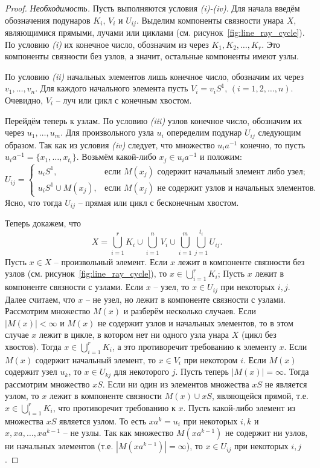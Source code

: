 \documentclass[11pt,twoside,final
]{article}
\begin{document}
\begin{proof}
	\textit{Необходимость.}
	Пусть выполняются условия \textit{(i)-(iv)}.
	Для начала введём обозначения подунаров $K_i$, $V_i$ и $U_{ij}$.
	Выделим компоненты связности унара $X$, являющимися прямыми, лучами или циклами (см. рисунок~\ref{fig:line_ray_cycle}).
	По условию \textit{(i)} их конечное число, обозначим из через $K_1, K_2, \ldots, K_r$.
	Это компоненты связности без узлов, а значит, остальные компоненты имеют узлы.

	По условию \textit{(ii)} начальных элементов лишь конечное число, обозначим их через $v_1,\ldots, v_n$.
	Для каждого начального элемента пусть $V_i = v_i S^1$, $(i=1,2,\ldots,n)$.
	Очевидно, $V_i$ -- луч или цикл с конечным хвостом.

	Перейдём теперь к узлам.
	По условию \textit{(iii)} узлов конечное число, обозначим их через $ u_1, \ldots, u_m$.
	Для произвольного узла $u_i$ опеределим подунар $U_{ij}$ следующим образом.
	Так как из условия \textit{(iv)} следует, что множество $u_i a^{-1}$ конечно, то пусть $u_i a^{-1} = \{ x_1, \ldots, x_{t_i} \}$.
	Возьмём какой-либо $x_j \in u_i a^{-1}$ и положим:
	\[
		U_{ij} =
		\begin{cases}
			u_i S^1,             & \text{если } M(x_j) \text{ содержит начальный элемент либо узел};    \\
			u_i S^1 \cup M(x_j), & \text{если } M(x_j) \text{ не содержит узлов и начальных элементов}.
		\end{cases}
	\]
	Ясно, что тогда $U_{ij}$ -- прямая или цикл с бесконечным хвостом.

	Теперь докажем, что
	\[
		X = \bigcup_{i = 1}^r K_i \cup \bigcup_{i = 1}^n V_i \cup \bigcup_{i = 1}^m \bigcup_{j = 1}^{t_i} U_{ij}.
	\]
	Пусть $x \in X$ -- произвольный элемент.
	Если $x$ лежит в компоненте связности без узлов (см. рисунок~\ref{fig:line_ray_cycle}), то $x \in \bigcup_{i = 1}^r K_i$;
	Пусть $x$ лежит в компоненте связности с узлами.
	Если $x$ -- узел, то $x \in U_{ij}$ при некоторых $i,j$.
	Далее считаем, что $x$ -- не узел, но лежит в компоненте связности с узлами.
	Рассмотрим множество $M(x)$ и разберём несколько случаев.
	Если $|M(x)| < \infty $ и $M(x)$ не содержит узлов и начальных элементов, то в этом случае $x$ лежит в цикле, в котором нет ни одного узла унара $X$ (цикл без хвостов).
	Тогда $x \in \bigcup_{i = 1}^r K_i$, а это противоречит требованию к элементу $x$.
	Если $M(x)$ содержит начальный элемент, то $x \in V_i$ при некотором $i$.
	Если $M(x)$ содержит узел $u_k$, то $x \in U_{kj}$ для некоторого $j$.
	Пусть теперь $|M(x)| = \infty$.
	Тогда рассмотрим множество $x S$.
	Если ни один из элементов множества $x S$ не является узлом, то $x$ лежит в компоненте связности $M(x) \cup xS$, являющейся прямой, т.е. $x \in \bigcup_{i = 1}^r K_i$, что противоречит требованию к $x$.
	Пусть какой-либо элемент из множества $xS$ является узлом.
	То есть $x a^k = u_i$ при некоторых $i,k$ и $x, xa, \ldots, xa^{k - 1}$ -- не узлы.
	Так как множество $M(x a^{k - 1})$ не содержит ни узлов, ни начальных элементов (т.е. $|M(x a^{k - 1})| = \infty$), то $x \in U_{ij}$ при некоторых $i,j$.


\end{proof}
\end{document}
